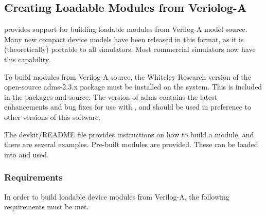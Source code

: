 \subsection{Creating Loadable Modules from Veriolog-A}


{\WRspice} provides support for building loadable modules
from Verilog-A model source.  Many new compact device models have been
released in this format, as it is (theoretically) portable to all
simulators.  Most commercial simulators now have this capability.

To build modules from Verilog-A source, the Whiteley Research version
of the open-source {\vt adms-2.3.x} package must be installed on the
system.  This is included in the {\XicTools} packages and source.  The
{\XicTools} version of {\vt adms} contains the latest enhancements and
bug fixes for use with {\WRspice}, and should be used in preference to
other versions of this software.

The {\vt devkit/README} file provides instructions on how to build a
module, and there are several examples.  Pre-built modules are
provided.  These can be loaded into {\WRspice} and used.

\subsubsection{Requirements}

In order to build loadable device modules from Verilog-A, the
following requirements must be met.

